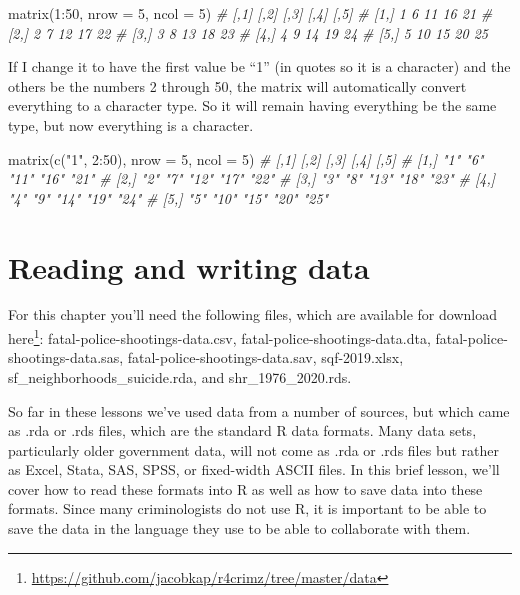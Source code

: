 \documentclass[
  a4paper,
]{krantz}
\makeatletter
\newenvironment{Shaded}{\begin{snugshade}}{\end{snugshade}}
\newcommand{\AttributeTok}[1]{\textcolor[rgb]{0.77,0.63,0.00}{#1}}
\newcommand{\CommentTok}[1]{\textcolor[rgb]{0.56,0.35,0.01}{\textit{#1}}}
\newcommand{\DecValTok}[1]{\textcolor[rgb]{0.00,0.00,0.81}{#1}}
\newcommand{\FunctionTok}[1]{\textcolor[rgb]{0.00,0.00,0.00}{#1}}
\newcommand{\NormalTok}[1]{#1}
\newcommand{\SpecialCharTok}[1]{\textcolor[rgb]{0.00,0.00,0.00}{#1}}
\newcommand{\StringTok}[1]{\textcolor[rgb]{0.31,0.60,0.02}{#1}}
\renewcommand{\href}[2]{#2\footnote{\url{#1}}}
\newenvironment{kframe}{%
\medskip{}
\setlength{\fboxsep}{.8em}
 \def\at@end@of@kframe{}%
 \ifinner\ifhmode%
  \def\at@end@of@kframe{\end{minipage}}%
  \begin{minipage}{\columnwidth}%
 \fi\fi%
 \def\FrameCommand##1{\hskip\@totalleftmargin \hskip-\fboxsep
 \colorbox{shadecolor}{##1}\hskip-\fboxsep
     \hskip-\linewidth \hskip-\@totalleftmargin \hskip\columnwidth}%
 \MakeFramed {\advance\hsize-\width
   \@totalleftmargin\z@ \linewidth\hsize
   \@setminipage}}%
 {\par\unskip\endMakeFramed%
 \at@end@of@kframe}
\renewenvironment{Shaded}{\begin{kframe}}{\end{kframe}}
\makeatother
\begin{document}
\begin{Shaded}
\begin{Highlighting}[]
\FunctionTok{matrix}\NormalTok{(}\DecValTok{1}\SpecialCharTok{:}\DecValTok{50}\NormalTok{, }\AttributeTok{nrow =} \DecValTok{5}\NormalTok{, }\AttributeTok{ncol =} \DecValTok{5}\NormalTok{)}
\CommentTok{\#      [,1] [,2] [,3] [,4] [,5]}
\CommentTok{\# [1,]    1    6   11   16   21}
\CommentTok{\# [2,]    2    7   12   17   22}
\CommentTok{\# [3,]    3    8   13   18   23}
\CommentTok{\# [4,]    4    9   14   19   24}
\CommentTok{\# [5,]    5   10   15   20   25}
\end{Highlighting}
\end{Shaded}

If I change it to have the first value be ``1'' (in quotes
so it is a character) and the others be the numbers 2
through 50, the matrix will automatically convert everything
to a character type. So it will remain having everything be
the same type, but now everything is a character.

\begin{Shaded}
\begin{Highlighting}[]
\FunctionTok{matrix}\NormalTok{(}\FunctionTok{c}\NormalTok{(}\StringTok{"1"}\NormalTok{, }\DecValTok{2}\SpecialCharTok{:}\DecValTok{50}\NormalTok{), }\AttributeTok{nrow =} \DecValTok{5}\NormalTok{, }\AttributeTok{ncol =} \DecValTok{5}\NormalTok{)}
\CommentTok{\#      [,1] [,2] [,3] [,4] [,5]}
\CommentTok{\# [1,] "1"  "6"  "11" "16" "21"}
\CommentTok{\# [2,] "2"  "7"  "12" "17" "22"}
\CommentTok{\# [3,] "3"  "8"  "13" "18" "23"}
\CommentTok{\# [4,] "4"  "9"  "14" "19" "24"}
\CommentTok{\# [5,] "5"  "10" "15" "20" "25"}
\end{Highlighting}
\end{Shaded}

\hypertarget{reading-and-writing-data}{%
\chapter{Reading and writing
data}\label{reading-and-writing-data}}

For this chapter you'll need the following files, which are
available for download
\href{https://github.com/jacobkap/r4crimz/tree/master/data}{here}:
fatal-police-shootings-data.csv,
fatal-police-shootings-data.dta,
fatal-police-shootings-data.sas,
fatal-police-shootings-data.sav, sqf-2019.xlsx,
sf\_neighborhoods\_suicide.rda, and shr\_1976\_2020.rds.

So far in these lessons we've used data from a number of
sources, but which came as .rda or .rds files, which are the
standard R data formats. Many data sets, particularly older
government data, will not come as .rda or .rds files but
rather as Excel, Stata, SAS, SPSS, or fixed-width ASCII
files. In this brief lesson, we'll cover how to read these
formats into R as well as how to save data into these
formats. Since many criminologists do not use R, it is
important to be able to save the data in the language they
use to be able to collaborate with them.
\end{document}
